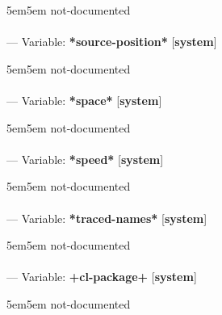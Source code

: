 \begin{adjustwidth}{5em}{5em}
not-documented
\end{adjustwidth}

\paragraph{}
\label{SYSTEM:*SOURCE-POSITION*}
--- Variable: \textbf{*source-position*} [\textbf{system}] \textit{}

\begin{adjustwidth}{5em}{5em}
not-documented
\end{adjustwidth}

\paragraph{}
\label{SYSTEM:*SPACE*}
--- Variable: \textbf{*space*} [\textbf{system}] \textit{}

\begin{adjustwidth}{5em}{5em}
not-documented
\end{adjustwidth}

\paragraph{}
\label{SYSTEM:*SPEED*}
--- Variable: \textbf{*speed*} [\textbf{system}] \textit{}

\begin{adjustwidth}{5em}{5em}
not-documented
\end{adjustwidth}

\paragraph{}
\label{SYSTEM:*TRACED-NAMES*}
--- Variable: \textbf{*traced-names*} [\textbf{system}] \textit{}

\begin{adjustwidth}{5em}{5em}
not-documented
\end{adjustwidth}

\paragraph{}
\label{SYSTEM:+CL-PACKAGE+}
--- Variable: \textbf{+cl-package+} [\textbf{system}] \textit{}

\begin{adjustwidth}{5em}{5em}
not-documented
\end{adjustwidth}

